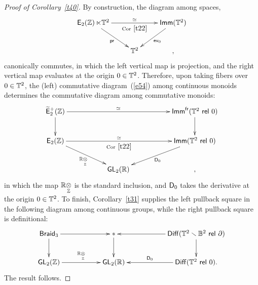 \documentclass{amsart}
\theoremstyle{definition}
\theoremstyle{remark}
\DeclareMathOperator{\pr}{\mathsf{pr}}
\DeclareMathOperator{\ev}{\mathsf{ev}}
\DeclareMathOperator{\Diff}{{\sf Diff}}
\DeclareMathOperator{\fr}{\sf fr}
\def\ot{\otimes}
\newcommand{\w}{\widetilde}
\def\sE{\mathsf E}\def\sF{\mathsf F}\def\sG{\mathsf G}\def\sH{\mathsf H}
\DeclareMathOperator{\Braid}{{\sf Braid}_3}
\DeclareMathOperator{\Ebraid}{\w{\sf E}_{2}^{+}(\ZZ)}
\DeclareMathOperator{\GL}{\sf GL}
\DeclareMathOperator{\Imm}{\sf Imm}
\DeclareMathOperator{\Aff}{\sf Aff}
\DeclareMathOperator{\EZ}{\sE_2(\ZZ)}
\begin{document}
%


















\begin{proof}[Proof of Corollary~\ref{t40}]
By construction, the diagram among spaces,
\[
\xymatrix{
\EZ \ltimes \TT^2
\ar[rr]^-{\simeq}_-{\rm Cor~\ref{t22}}
\ar[dr]_-{\pr}
&&
\Imm(\TT^2)
\ar[dl]^-{\ev_0}
\\
&
\TT^2
&
,
}
\]
canonically commutes, in which the left vertical map is projection, and the right vertical map evaluates at the origin $0\in \mathbb T^2$.  
Therefore, upon taking fibers over $0\in \mathbb T^2$, the (left) commutative diagram~(\ref{e54}) among continuous monoids determines the commutative diagram among commutative monoids:
\begin{equation*}
\xymatrix{
\Ebraid
\ar[rrrr]^-{\simeq}
\ar[d]
&&
&&
\Imm^{\fr}(\TT^2 ~{\sf rel } ~0)
\ar[d]
\\
\EZ
\ar[rrrr]^-{\simeq}_-{\rm Cor~\ref{t22}}
\ar[drr]_-{\RR \underset{\ZZ}\ot}
&&
&&
\Imm(\TT^2 ~{\sf rel } ~0)
\ar[dll]^-{\sD_0}
\\
&&
\GL_2(\RR)
&&
,
}
\end{equation*}
in which the map $\RR \underset{\ZZ}\ot $ is the standard inclusion, and $\mathsf D_0$ takes the derivative at the origin $0\in \mathbb T^2$.
To finish, Corollary~\ref{t31} supplies the left pullback square in the following diagram among continuous groups, while the right pullback square is definitional:
\[
\xymatrix{
\Braid
\ar[rr]
\ar[d]
&&
\ast
\ar[d]
&&
\Diff(\TT^2 \smallsetminus \BB^2 ~{\sf rel}~\partial )
\ar[ll]
\ar[d]
\\
\GL_2(\ZZ)
\ar[rr]^-{\RR \underset{\ZZ}\ot}
&&
\GL_2(\RR)
&&
\Diff(\TT^2~{\sf rel}~0)
\ar[ll]_-{\sD_0}
.
}
\]
The result follows. 

\end{proof}
\end{document}
